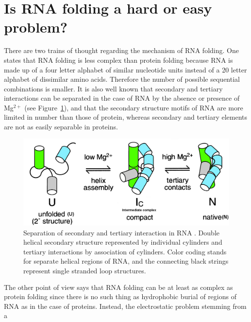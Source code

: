 \section{Is RNA folding a hard or easy problem?}
There  are  two trains  of  thought  regarding  the mechanism  of  RNA
folding.  One  states that  RNA folding is  less complex  than protein
folding  \cite{tinoco1999} because  RNA is  made up  of a  four letter
alphabet of similar  nucleotide units instead of a  20 letter alphabet
of  dissimilar   amino  acids.   Therefore  the   number  of  possible
sequential  combinations  is smaller.   It  is  also  well known  that
secondary and  tertiary interactions can  be separated in the  case of
RNA  by the absence  or presence  of Mg$^{2+}$  \cite{rangan2003} (see
Figure~\ref{fig:folding}), and  that the secondary structure motifs
of RNA are more limited  in  number  than  those  of protein,  whereas
secondary  and tertiary elements are not as easily separable in
proteins.
\begin{figure}[ht]
\centering
\includegraphics[scale=0.3]{Chapter1/rangan2003pnas.png}
\caption{Separation  of  secondary  and  tertiary interaction  in  RNA
  \cite{rangan2003}. Double helical secondary structure represented by
  individual  cylinders and  tertiary interactions  by  association of
  cylinders. Color coding stands for separate  helical regions of
  RNA, and the connecting  black strings represent single stranded loop
  structures.}
\label{fig:folding}
\end{figure}
The  other point of  view says  that RNA  folding can  be at  least as
complex as protein folding \cite{moore1999a, sorin2004} since there is
no such thing  as hydrophobic burial of regions of RNA  as in the case
of  proteins.   Instead, the  electrostatic  problem  stemming from  a
